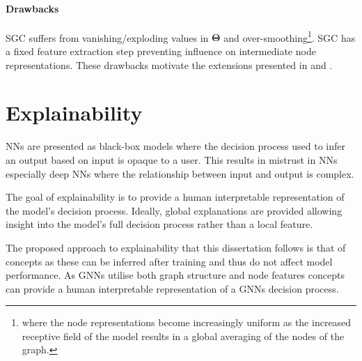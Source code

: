 \paragraph{Drawbacks}
SGC suffers from vanishing/exploding values in $\bm{\Theta}$ and over-smoothing\footnote{where the node representations become increasingly uniform as the increased receptive field of the model results in a global averaging of the nodes of the graph.}.
SGC has a fixed feature extraction step preventing influence on intermediate node representations.
These drawbacks motivate the extensions presented in  and .




\section{Explainability}




NNs are presented as black-box models where the decision process used to infer an output based on input is opaque to a user.
This results in mistrust in NNs especially deep NNs where the relationship between input and output is complex.

The goal of explainability is to provide a human interpretable representation of the model's decision process.
Ideally, global explanations are provided allowing insight into the model's full decision process rather than a local feature.

The proposed approach to explainability that this dissertation follows is that of concepts as these can be inferred after training and thus do not affect model performance.
As GNNs utilise both graph structure and node features concepts can provide a human interpretable representation of a GNNs decision process.

